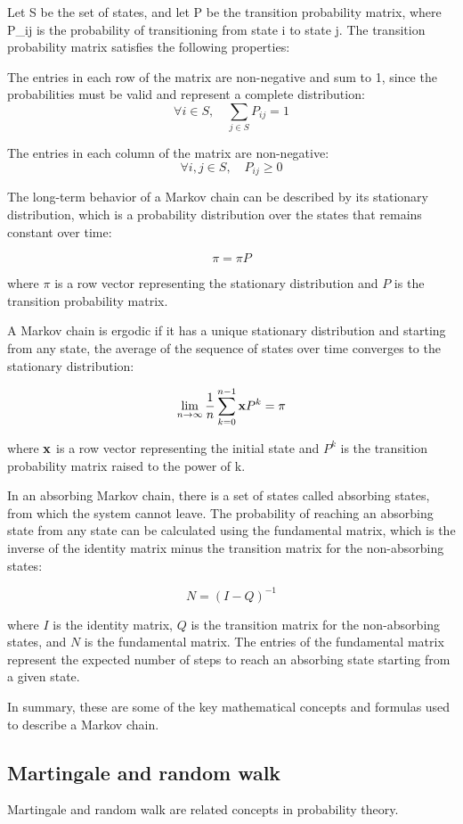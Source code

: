 \documentclass[12pt, a4paper, oneside]{article}
\begin{document}
Let S be the set of states, and let P be the transition probability matrix, where P_{ij} is the probability of transitioning from state i to state j. The transition probability matrix satisfies the following properties:

The entries in each row of the matrix are non-negative and sum to 1, since the probabilities must be valid and represent a complete distribution:
$$ \forall i \in S, \quad \sum_{j\in S} P_{ij} = 1 $$

The entries in each column of the matrix are non-negative:
$$ \forall i,j \in S, \quad P_{ij} \ge 0 $$

The long-term behavior of a Markov chain can be described by its stationary distribution, which is a probability distribution over the states that remains constant over time:

$$ \pi = \pi P $$

where $\pi$ is a row vector representing the stationary distribution and $P$ is the transition probability matrix.

A Markov chain is ergodic if it has a unique stationary distribution and starting from any state, the average of the sequence of states over time converges to the stationary distribution:

$$ \lim_{n\to\infty} \frac{1}{n} \sum_{k=0}^{n-1} \bold{x} P^k = \pi $$

where $\bold{x}$ is a row vector representing the initial state and $P^k$ is the transition probability matrix raised to the power of k.

In an absorbing Markov chain, there is a set of states called absorbing states, from which the system cannot leave. The probability of reaching an absorbing state from any state can be calculated using the fundamental matrix, which is the inverse of the identity matrix minus the transition matrix for the non-absorbing states:

$$ N = (I - Q)^{-1} $$

where $I$ is the identity matrix, $Q$ is the transition matrix for the non-absorbing states, and $N$ is the fundamental matrix. The entries of the fundamental matrix represent the expected number of steps to reach an absorbing state starting from a given state.

In summary, these are some of the key mathematical concepts and formulas used to describe a Markov chain.




\subsection{ Martingale and random walk }
Martingale and random walk are related concepts in probability theory.
\end{document}
